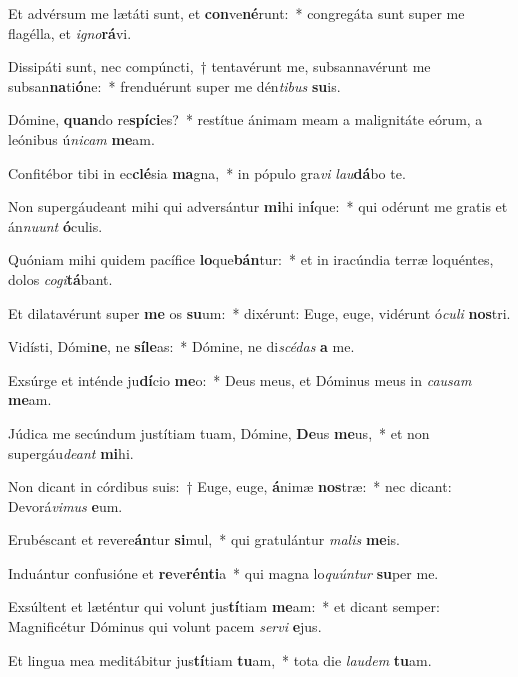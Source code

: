 \item Et advérsum me lætáti sunt, et \textbf{con}ve\textbf{né}runt:~* congregáta sunt super me flagélla, et \textit{i}\textit{gno}\textbf{rá}vi.
\item Dissipáti sunt, nec compúncti,~† tentavérunt me, subsannavérunt me subsan\textbf{na}ti\textbf{ó}ne:~* frenduérunt super me dén\textit{ti}\textit{bus} \textbf{su}is.
\item Dómine, \textbf{quan}do re\textbf{spí}\textbf{ci}es?~* restítue ánimam meam a malignitáte eórum, a leónibus ú\textit{ni}\textit{cam} \textbf{me}am.
\item Confitébor tibi in ec\textbf{clé}sia \textbf{ma}gna,~* in pópulo gra\textit{vi} \textit{lau}\textbf{dá}bo te.
\item Non supergáudeant mihi qui adversántur \textbf{mi}hi in\textbf{í}que:~* qui odérunt me gratis et án\textit{nu}\textit{unt} \textbf{ó}culis.
\item Quóniam mihi quidem pacífice \textbf{lo}que\textbf{bán}tur:~* et in iracúndia terræ loquéntes, dolos \textit{co}\textit{gi}\textbf{tá}bant.
\item Et dilatavérunt super \textbf{me} os \textbf{su}um:~* dixérunt: Euge, euge, vidérunt ó\textit{cu}\textit{li} \textbf{nos}tri.
\item Vidísti, Dómi\textbf{ne}, ne \textbf{sí}\textbf{le}as:~* Dómine, ne di\textit{scé}\textit{das} \textbf{a} me.
\item Exsúrge et inténde ju\textbf{dí}cio \textbf{me}o:~* Deus meus, et Dóminus meus in \textit{cau}\textit{sam} \textbf{me}am.
\item Júdica me secúndum justítiam tuam, Dómine, \textbf{De}us \textbf{me}us,~* et non supergáu\textit{de}\textit{ant} \textbf{mi}hi.
\item Non dicant in córdibus suis:~† Euge, euge, \textbf{á}nimæ \textbf{nos}træ:~* nec dicant: Devorá\textit{vi}\textit{mus} \textbf{e}um.
\item Erubéscant et revere\textbf{án}tur \textbf{si}mul,~* qui gratulántur \textit{ma}\textit{lis} \textbf{me}is.
\item Induántur confusióne et \textbf{re}ve\textbf{rén}\textbf{ti}a~* qui magna lo\textit{quún}\textit{tur} \textbf{su}per me.
\item Exsúltent et læténtur qui volunt jus\textbf{tí}tiam \textbf{me}am:~* et dicant semper: Magnificétur Dóminus qui volunt pacem \textit{ser}\textit{vi} \textbf{e}jus.
\item Et lingua mea meditábitur jus\textbf{tí}tiam \textbf{tu}am,~* tota die \textit{lau}\textit{dem} \textbf{tu}am.
